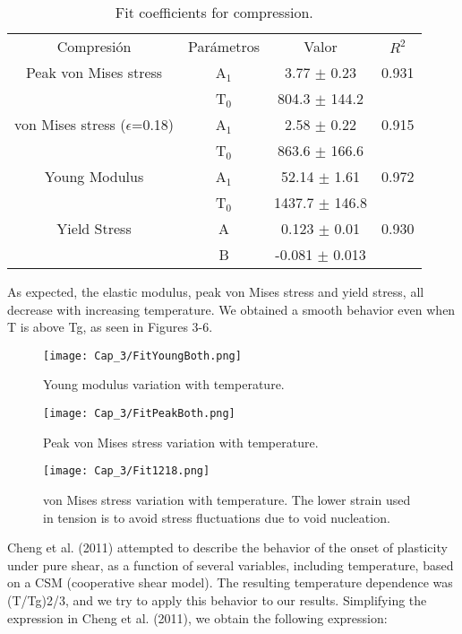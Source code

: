\begin{table}[htp]
\caption{Fit coefficients for compression.}
\begin{center}
\begin{tabular}{*{4}{c}}
Compresión & Parámetros & Valor & $R^{2}$ \\
Peak von Mises stress & A$_{1}$ & 3.77 $\pm$ 0.23 & 0.931 \\
 & T$_{0}$ & 804.3 $\pm$ 144.2 & \\
von Mises stress ($\epsilon$=0.18) & A$_{1}$ & 2.58 $\pm$ 0.22 & 0.915 \\
 & T$_{0}$ & 863.6 $\pm$ 166.6 & \\
Young Modulus & A$_{1}$ & 52.14 $\pm$ 1.61 & 0.972 \\
 & T$_{0}$ & 1437.7 $\pm$ 146.8 & \\
Yield Stress & A & 0.123 $\pm$ 0.01 & 0.930 \\
 & B & -0.081 $\pm$ 0.013 & 
\end{tabular}
\end{center}
\label{C3:tb:initPropsComp}
\end{table}

As expected, the elastic modulus, peak von Mises stress and yield stress, all decrease with increasing temperature. We obtained a smooth behavior even when T is above Tg, as seen in Figures 3-6.

\begin{figure}[htp]
\centering
\texttt{[image: Cap\_3/FitYoungBoth.png]}
\caption{Young modulus variation with temperature.}
\label{C3:fg:youngVsT}
\end{figure}

\begin{figure}[htp]
\centering
\texttt{[image: Cap\_3/FitPeakBoth.png]}
\caption{Peak von Mises stress variation with temperature.}
\label{C3:fg:peakVMisesVsT}
\end{figure}

\begin{figure}[htp]
\centering
\texttt{[image: Cap\_3/Fit1218.png]}
\caption{von Mises stress variation with temperature. The lower strain used in tension is to avoid stress fluctuations due to void nucleation.}
\label{C3:fg:peakVMises1218VsT}
\end{figure} 

Cheng et al. (2011) attempted to describe the behavior of the onset of plasticity under pure shear, as a function of several variables, including temperature, based on a CSM (cooperative shear model). The resulting temperature dependence was (T/Tg)2/3, and we try to apply this behavior to our results. Simplifying the expression in Cheng et al. (2011), we obtain the following expression:

